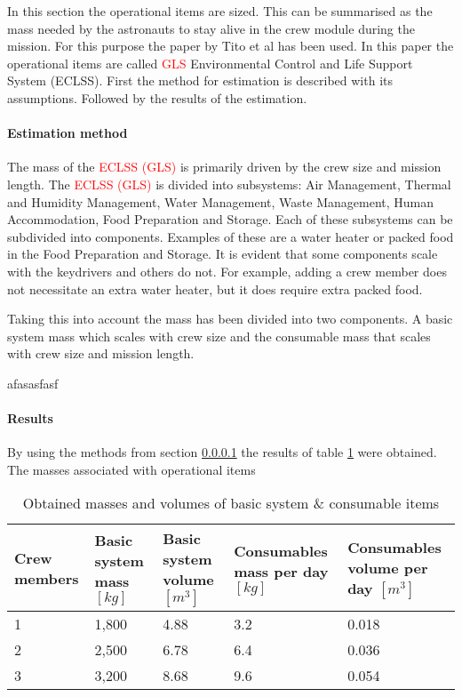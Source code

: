 In this section the operational items are sized. This can be summarised as the mass needed by the astronauts to stay alive in the crew module during the mission. For this purpose the paper by Tito et al \cite{tito2013} has been used. In this paper the operational items are called \textcolor{red}{GLS} Environmental Control and Life Support System (ECLSS). First the method for estimation is described with its assumptions. Followed by the results of the estimation.

\paragraph{Estimation method}
\label{par:operationalest}
The mass of the \textcolor{red}{ECLSS (GLS)} is primarily driven by the crew size and mission length. The \textcolor{red}{ECLSS (GLS)} is divided into subsystems: Air Management, Thermal and Humidity Management, Water Management, Waste Management, Human Accommodation, Food Preparation and Storage. Each of these subsystems can be subdivided into components. Examples of these are a water heater or packed food in the Food Preparation and Storage. It is evident that some components scale with the keydrivers and others do not. For example, adding a crew member does not necessitate an extra water heater, but it does require extra packed food. 


Taking this into account the mass has been divided into two components. A basic system mass which scales with crew size and the consumable mass that scales with crew size and mission length.





afasasfasf
\paragraph{Results}
By using the methods from section \ref{par:operationalest} the results of table \ref{tab:operationalest} were obtained.
The masses associated with operational items 
\begin{table}[h]
	\centering
	\caption{Obtained masses and volumes of basic system \& consumable items}
	\begin{tabular}{|p{2cm}|p{2cm}|p{2cm}|p{2.5cm}|p{2.5cm}|}
		\hline
		\textbf{Crew members} & \textbf{Basic system mass $[kg]$} & \textbf{Basic system volume $[m^{3}]$} & \textbf{Consumables mass per day $[kg]$} & \textbf{Consumables volume per day $[m^{3}]$} \\ \hline \hline
		1 & 1,800 & 4.88 & 3.2 & 0.018 \\
		2 & 2,500 & 6.78 & 6.4 & 0.036 \\
		3 & 3,200 & 8.68 & 9.6 & 0.054 \\
		\hline
	\end{tabular}
	\label{tab:operationalest}
\end{table}
